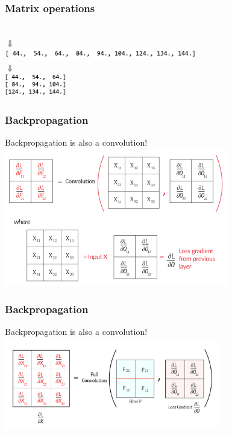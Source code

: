 \documentclass[10pt]{beamer}
\begin{document}
\begin{frame}
\frametitle{Matrix operations}
\begin{center}
\\
$\Downarrow$\\
\includegraphics[height=0.45cm]{images/result.png}\\
$\Downarrow$\\
\vspace*{0.1cm}
\includegraphics[height=1cm]{images/reshape.png}
\end{center}
\end{frame}

\begin{frame}
\frametitle{Backpropagation}
\begin{center}
Backpropagation is also a convolution!\\

\includegraphics[height=6cm]{images/backprop.png}
\end{center}
\end{frame}

\begin{frame}
\frametitle{Backpropagation}
\begin{center}
Backpropagation is also a convolution!\\

\includegraphics[height=4cm]{images/backprop2.png}
\end{center}
\end{frame}
\end{document}
